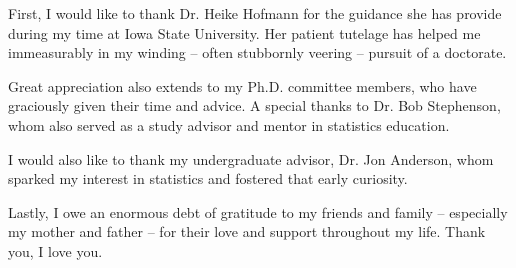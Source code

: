 
First, I would like to thank Dr. Heike Hofmann for the guidance she has provide during my time at Iowa State University. Her patient tutelage has helped me immeasurably in my winding -- often stubbornly veering -- pursuit of a doctorate. 

Great appreciation also extends to my Ph.D. committee members, who have graciously given their time and advice. A special thanks to Dr. Bob Stephenson, whom also served as a study advisor and mentor in statistics education. 

I would also like to thank my undergraduate advisor, Dr. Jon Anderson, whom sparked my interest in statistics and fostered that early curiosity. 

Lastly, I owe an enormous debt of gratitude to my friends and family -- especially my mother and father -- for their love and support throughout my life. Thank you, I love you. 